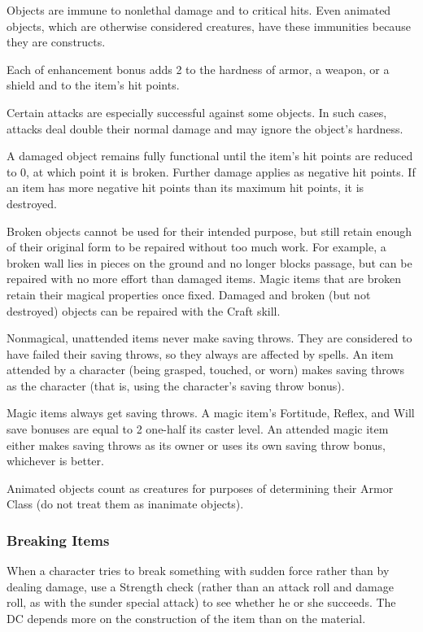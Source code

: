  Objects are immune to nonlethal damage and to critical hits. Even animated objects, which are otherwise considered creatures, have these immunities because they are constructs.

 Each  of enhancement bonus adds 2 to the hardness of armor, a weapon, or a shield and  to the item's hit points.

 Certain attacks are especially successful against some objects. In such cases, attacks deal double their normal damage and may ignore the object's hardness.

 A damaged object remains fully functional until the item's hit points are reduced to 0, at which point it is broken. Further damage applies as negative hit points. If an item has more negative hit points than its maximum hit points, it is destroyed.

Broken objects cannot be used for their intended purpose, but still retain enough of their original form to be repaired without too much work. For example, a broken wall lies in pieces on the ground and no longer blocks passage, but can be repaired with no more effort than damaged items. Magic items that are broken retain their magical properties once fixed. Damaged and broken (but not destroyed) objects can be repaired with the Craft skill.

 Nonmagical, unattended items never make saving throws. They are considered to have failed their saving throws, so they always are affected by spells. An item attended by a character (being grasped, touched, or worn) makes saving throws as the character (that is, using the character's saving throw bonus).

\par Magic items always get saving throws. A magic item's Fortitude, Reflex, and Will save bonuses are equal to 2 \add one-half its caster level. An attended magic item either makes saving throws as its owner or uses its own saving throw bonus, whichever is better.

 Animated objects count as creatures for purposes of determining their Armor Class (do not treat them as inanimate objects).

\subsubsection{Breaking Items}
When a character tries to break something with sudden force rather than by dealing damage, use a Strength check (rather than an attack roll and damage roll, as with the sunder special attack) to see whether he or she succeeds. The DC depends more on the
construction of the item than on the material.


